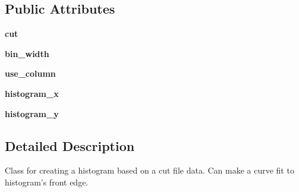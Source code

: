 \subsection*{Public Attributes}
\begin{DoxyCompactItemize}
\item 
\hypertarget{classModules_1_1Calibration_1_1TOFCalibrationHistogram_a8c318711ce7e317c529ad1ff1181babb}{{\bfseries cut}}\label{classModules_1_1Calibration_1_1TOFCalibrationHistogram_a8c318711ce7e317c529ad1ff1181babb}

\item 
\hypertarget{classModules_1_1Calibration_1_1TOFCalibrationHistogram_ad356fdcfec160beea21b23b24f5646b6}{{\bfseries bin\-\_\-width}}\label{classModules_1_1Calibration_1_1TOFCalibrationHistogram_ad356fdcfec160beea21b23b24f5646b6}

\item 
\hypertarget{classModules_1_1Calibration_1_1TOFCalibrationHistogram_a5b7be2fede48d9594d1a2c491c74bd65}{{\bfseries use\-\_\-column}}\label{classModules_1_1Calibration_1_1TOFCalibrationHistogram_a5b7be2fede48d9594d1a2c491c74bd65}

\item 
\hypertarget{classModules_1_1Calibration_1_1TOFCalibrationHistogram_a73eeb68ad8f1880563c25214d32ca1ec}{{\bfseries histogram\-\_\-x}}\label{classModules_1_1Calibration_1_1TOFCalibrationHistogram_a73eeb68ad8f1880563c25214d32ca1ec}

\item 
\hypertarget{classModules_1_1Calibration_1_1TOFCalibrationHistogram_a41623e1bf904159e87c22665ca1550cf}{{\bfseries histogram\-\_\-y}}\label{classModules_1_1Calibration_1_1TOFCalibrationHistogram_a41623e1bf904159e87c22665ca1550cf}

\end{DoxyCompactItemize}


\subsection{Detailed Description}
\begin{DoxyVerb}Class for creating a histogram based on a cut file data. Can make a curve 
fit to histogram's front edge.
\end{DoxyVerb}
 

